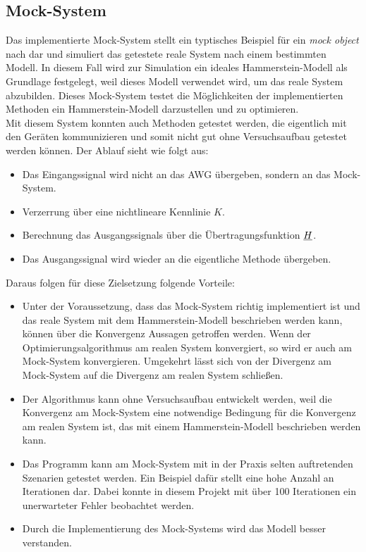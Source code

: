 \documentclass[../Report.tex]{subfiles}
\begin{document}
\subsection{Mock-System}
\label{subsec:code.mock}
Das implementierte Mock-System stellt ein typtisches Beispiel für ein \textit{mock object} nach \cite{mock} dar und simuliert das getestete reale System nach einem bestimmten Modell. In diesem Fall wird zur Simulation ein ideales Hammerstein-Modell als Grundlage festgelegt, weil dieses Modell verwendet wird, um das reale System abzubilden. Dieses Mock-System testet die Möglichkeiten der implementierten Methoden ein Hammerstein-Modell darzustellen und zu optimieren.\\
Mit diesem System konnten auch Methoden getestet werden, die eigentlich mit den Geräten kommunizieren und somit nicht gut ohne Versuchsaufbau getestet werden können. Der Ablauf sieht wie folgt aus:
\begin{itemize}
	\item Das Eingangssignal wird nicht an das AWG übergeben, sondern an das Mock-System.
	\item Verzerrung über eine nichtlineare Kennlinie $K$.
	\item Berechnung das Ausgangssignals über die Übertragungsfunktion $\underline{H}$.
	\item Das Ausgangssignal wird wieder an die eigentliche Methode übergeben.
\end{itemize}
Daraus folgen für diese Zielsetzung folgende Vorteile:
\begin{itemize}
	\item Unter der Voraussetzung, dass das Mock-System richtig implementiert ist und das reale System mit dem Hammerstein-Modell beschrieben werden kann, können über die Konvergenz Aussagen getroffen werden. Wenn der Optimierungsalgorithmus am realen System konvergiert, so wird er auch am Mock-System konvergieren. Umgekehrt lässt sich von der Divergenz am Mock-System auf die Divergenz am realen System schließen.
	\item Der Algorithmus kann ohne Versuchsaufbau entwickelt werden, weil die Konvergenz am Mock-System eine notwendige Bedingung für die Konvergenz am realen System ist, das mit einem Hammerstein-Modell beschrieben werden kann.
	\item Das Programm kann am Mock-System mit in der Praxis selten auftretenden Szenarien getestet werden. Ein Beispiel dafür stellt eine hohe Anzahl an Iterationen dar. Dabei konnte in diesem Projekt mit über 100 Iterationen ein unerwarteter Fehler beobachtet werden.
	\item Durch die Implementierung des Mock-Systems wird das Modell besser verstanden.
\end{itemize}
\end{document}
